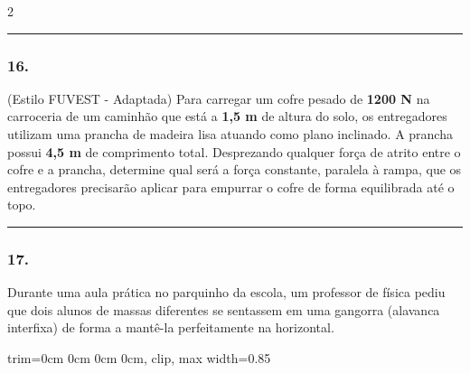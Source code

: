 \documentclass[twoside, 10pt, a4paper]{article}
\newlength{\espacoPreQuestao}\setlength{\espacoPreQuestao}{0.1cm}
\newlength{\espacoQuestao}\setlength{\espacoQuestao}{0.2cm}
\newcommand{\larguraTikz}{0.85\linewidth}
\begin{document}
\begin{multicols*}{2}
\noindent\textcolor{CorLinha}{\rule{\linewidth}{0.5pt}} 
\par\vspace{\espacoPreQuestao}
\subsubsection*{16.} (Estilo FUVEST - Adaptada) Para carregar um cofre pesado de \textbf{1200 N} na carroceria de um caminhão que está a \textbf{1,5 m} de altura do solo, os entregadores utilizam uma prancha de madeira lisa atuando como plano inclinado. A prancha possui \textbf{4,5 m} de comprimento total. Desprezando qualquer força de atrito entre o cofre e a prancha, determine qual será a força constante, paralela à rampa, que os entregadores precisarão aplicar para empurrar o cofre de forma equilibrada até o topo.
\par\vspace{\espacoQuestao}

\noindent\textcolor{CorLinha}{\rule{\linewidth}{0.5pt}} 
\par\vspace{\espacoPreQuestao}
\subsubsection*{17.} Durante uma aula prática no parquinho da escola, um professor de física pediu que dois alunos de massas diferentes se sentassem em uma gangorra (alavanca interfixa) de forma a mantê-la perfeitamente na horizontal.
\begin{center}
\begin{adjustbox}{trim=0cm 0cm 0cm 0cm, clip, max width=\larguraTikz}
\end{adjustbox}
\end{center}
\end{multicols*}
\end{document}
